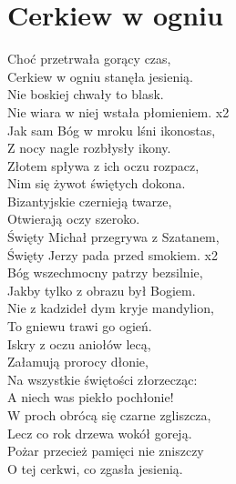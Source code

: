 \section{Cerkiew w ogniu}
\noindent %
\begin{minipage}[t]{\dimexpr.4\textwidth-.4\columnsep}
    Choć przetrwała gorący czas,\\
    Cerkiew w ogniu stanęła jesienią.\\
    Nie boskiej chwały to blask.\\
    Nie wiara w niej wstała płomieniem. x2\\
    \hfill\break
    Jak sam Bóg w mroku lśni ikonostas,\\
    Z nocy nagle rozbłysły ikony.\\
    Złotem spływa z ich oczu rozpacz,\\
    Nim się żywot świętych dokona.\\
    \hfill\break
    Bizantyjskie czernieją twarze,\\
    Otwierają oczy szeroko.\\
    \vin Święty Michał przegrywa z Szatanem,\\
    \vin Święty Jerzy pada przed smokiem. x2\\
    \hfill\break
    Bóg wszechmocny patrzy bezsilnie,\\
    Jakby tylko z obrazu był Bogiem.\\
    Nie z kadzideł dym kryje mandylion,\\
    To gniewu trawi go ogień.\\
    \hfill\break
    Iskry z oczu aniołów lecą,\\
    Załamują prorocy dłonie,\\
    Na wszystkie świętości złorzecząc:\\
    A niech was piekło pochłonie!\\
    \hfill\break
    W proch obrócą się czarne zgliszcza,\\
    Lecz co rok drzewa wokół goreją.\\
    Pożar przecież pamięci nie zniszczy\\
    O tej cerkwi, co zgasła jesienią.\\
\end{minipage}
\hfill
\begin{minipage}[t]{\dimexpr.05\textwidth-.05\columnsep}
    \ifchorded %
    \hfill\break
    \hfill\break
    \else
    \fi
\end{minipage}